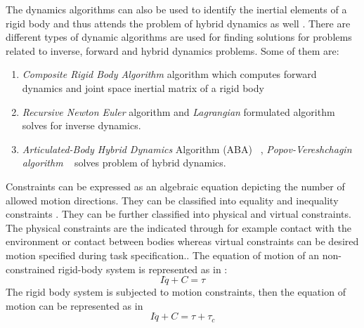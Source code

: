 The dynamics algorithms can also be used to identify the inertial elements of a rigid body and thus attends the problem of hybrid dynamics as well \cite{featherstone2014rigid}. There are different types of dynamic algorithms are used for finding solutions for problems related to inverse, forward and hybrid dynamics problems. Some of them are:
\begin{enumerate}
	\item \textit{Composite Rigid Body Algorithm} algorithm which computes forward dynamics and joint space inertial matrix of a rigid body \cite{felis2017rbdl}
	\item \textit{Recursive Newton Euler} algorithm and \textit{Lagrangian} formulated algorithm solves for inverse dynamics.
	\item \textit{Articulated-Body Hybrid Dynamics} Algorithm (ABA) ~\cite{featherstone2014rigid}, \textit{Popov-Vereshchagin algorithm} ~\cite{shakhimardanov2015composable} solves problem of hybrid dynamics.
\end{enumerate}	
Constraints can be expressed as an algebraic equation depicting the number of allowed motion directions. They can be classified into equality and inequality constraints \cite{featherstone2014rigid}. They can be further classified into physical and virtual constraints. The physical constraints are the indicated through for example contact with the environment or contact between bodies whereas virtual constraints can be desired motion specified during task specification.\cite{featherstone2014rigid}. The equation of motion of an non-constrained rigid-body system is represented as in \cite{featherstone2014rigid}:
\begin{equation}
I\ddot{q}+C = \tau
\end{equation}
The rigid body system is subjected to motion constraints, then the equation of motion can be represented as in \cite{featherstone2014rigid}
\begin{equation}
I\ddot{q}+C = \tau + \tau_{c}
\end{equation}
